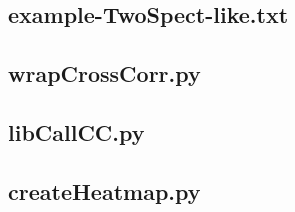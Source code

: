 \documentclass{article}
\begin{document}
\subsection{example-TwoSpect-like.txt}

\subsection{wrapCrossCorr.py}

\subsection{libCallCC.py}

\subsection{createHeatmap.py}

\end{document}
